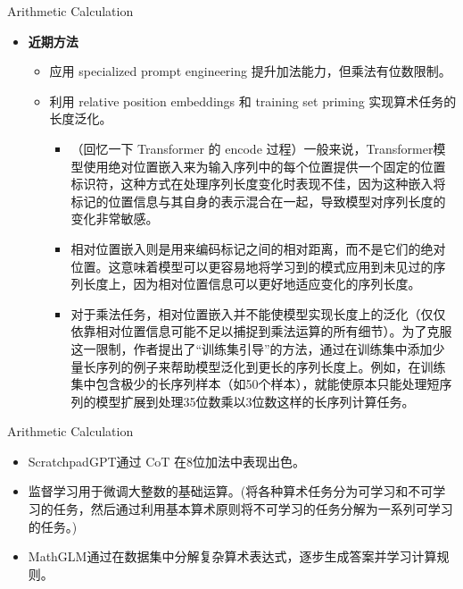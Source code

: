 \begin{frame}{Arithmetic Calculation}
	\begin{itemize}
		\item \textbf{近期方法}
		      \begin{itemize}
			      \item 应用 specialized prompt engineering 提升加法能力，但乘法有位数限制。
			            \pause
			      \item 利用 relative position embeddings 和 training set priming 实现算术任务的长度泛化。
			            \pause
			            \begin{itemize}
				            \item （回忆一下 Transformer 的 encode 过程）一般来说，Transformer模型使用绝对位置嵌入来为输入序列中的每个位置提供一个固定的位置标识符，这种方式在处理序列长度变化时表现不佳，因为这种嵌入将标记的位置信息与其自身的表示混合在一起，导致模型对序列长度的变化非常敏感。
				                  \pause
				            \item 相对位置嵌入则是用来编码标记之间的相对距离，而不是它们的绝对位置。这意味着模型可以更容易地将学习到的模式应用到未见过的序列长度上，因为相对位置信息可以更好地适应变化的序列长度。
				                  \pause
				            \item 对于乘法任务，相对位置嵌入并不能使模型实现长度上的泛化（仅仅依靠相对位置信息可能不足以捕捉到乘法运算的所有细节）。为了克服这一限制，作者提出了“训练集引导”的方法，通过在训练集中添加少量长序列的例子来帮助模型泛化到更长的序列长度上。例如，在训练集中包含极少的长序列样本（如50个样本），就能使原本只能处理短序列的模型扩展到处理35位数乘以3位数这样的长序列计算任务。
			            \end{itemize}

		      \end{itemize}
	\end{itemize}

\end{frame}

\begin{frame}{Arithmetic Calculation}
	\begin{itemize}
		\item ScratchpadGPT通过 CoT 在8位加法中表现出色。
		      \pause
		\item 监督学习用于微调大整数的基础运算。(将各种算术任务分为可学习和不可学习的任务，然后通过利用基本算术原则将不可学习的任务分解为一系列可学习的任务。)
		      \pause
		\item MathGLM通过在数据集中分解复杂算术表达式，逐步生成答案并学习计算规则。
	\end{itemize}
\end{frame}

